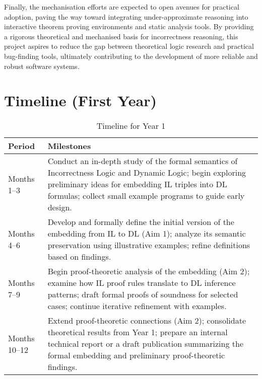 Finally, the mechanisation efforts are expected to open avenues for practical adoption, paving the way toward integrating under-approximate reasoning into interactive theorem proving environments and static analysis tools. By providing a rigorous theoretical and mechanised basis for incorrectness reasoning, this project aspires to reduce the gap between theoretical logic research and practical bug-finding tools, ultimately contributing to the development of more reliable and robust software systems.

\section*{Timeline (First Year)}
\vspace{-1em}
\begin{table}[htbp]
\centering
\caption{Timeline for Year 1}
\vspace{1ex}
\begin{tabular}{|l|p{10cm}|}
\hline
\textbf{Period}   & \textbf{Milestones}                                                                                                    \\ \hline
Months 1--3   & Conduct an in-depth study of the formal semantics of Incorrectness Logic and Dynamic Logic; begin exploring preliminary ideas for embedding IL triples into DL formulas; collect small example programs to guide early design.         \\ \hline
Months 4--6   & Develop and formally define the initial version of the embedding from IL to DL (Aim 1); analyze its semantic preservation using illustrative examples; refine definitions based on findings.          \\ \hline
Months 7--9   & Begin proof-theoretic analysis of the embedding (Aim 2); examine how IL proof rules translate to DL inference patterns; draft formal proofs of soundness for selected cases; continue iterative refinement with examples.   \\ \hline
Months 10--12 & Extend proof-theoretic connections (Aim 2); consolidate theoretical results from Year 1; prepare an internal technical report or a draft publication summarizing the formal embedding and preliminary proof-theoretic findings. \\ \hline
\end{tabular}
\end{table}
